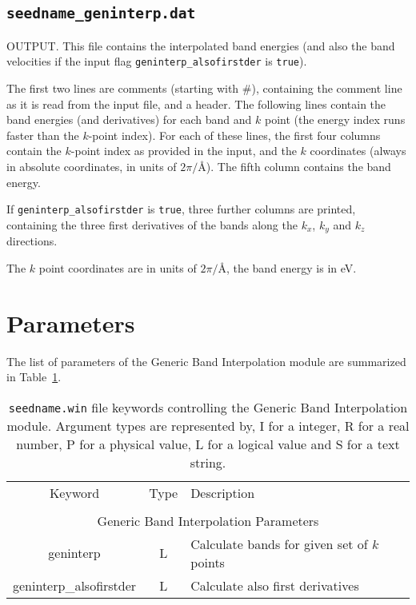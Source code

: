 \subsection{{\tt seedname\_geninterp.dat}}
OUTPUT. This file contains the interpolated band energies (and also the band
velocities if the input flag \verb#geninterp_alsofirstder# is \verb#true#).

The first two lines are comments (starting with \#), containing the
comment line as it is read from the input file, and a header.
The following lines contain the band energies (and
derivatives) for each band and $k$ point (the energy
index runs faster than the $k$-point index).
For each of these lines, the first four columns contain the $k$-point index as provided in the
input, and the $k$ coordinates (always in absolute coordinates, in
units of $2\pi/$\AA).
The fifth column contains the band energy.

If \verb#geninterp_alsofirstder# is \verb#true#, three further columns
are printed, containing the three first derivatives of the bands along the $k_x$, $k_y$
and $k_z$ directions.

The $k$ point coordinates are in units of $2\pi/$\AA, the band energy is in eV.

\section{Parameters}
The list of parameters of the Generic Band Interpolation module are summarized in Table~\ref{parameter_keywords_geninterp}. 

\begin{table}
\begin{center}
\begin{tabular}{|c|c|p{6cm}|}
\hline
Keyword & Type & Description \\
        &      &             \\
\hline\hline
\multicolumn{3}{|c|}{Generic Band Interpolation Parameters} \\
\hline
{\sc geninterp}   & L & Calculate bands for given set of $k$ points \\
{\sc geninterp\_alsofirstder} & L & Calculate also first derivatives\\ 
\hline
\end{tabular}
\caption[Parameter file keywords controlling the Generic Band Interpolation module.]
{{\tt seedname.win} file keywords controlling the Generic Band Interpolation module. Argument types
are represented by, I for a integer, R for a real number, P for a
physical value, L for a logical value and S for a text string.}
\label{parameter_keywords_geninterp}
\end{center}
\end{table}

